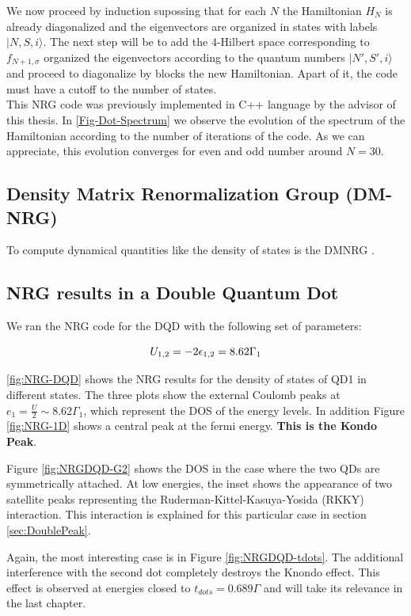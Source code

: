 We now proceed by induction supossing that for each $N$ the Hamiltonian $H_{N}$ is already diagonalized and the eigenvectors are organized in states with labels $\vert N,S,i\rangle.$ The next step will be to add the $4$-Hilbert space corresponding to $f_{N+1,\sigma}$ organized the eigenvectors according to the quantum numbers $\vert N',S',i\rangle$ and proceed to diagonalize by blocks the new Hamiltonian. Apart of it, the code must have a cutoff to the number of states. \\

This NRG code was previously implemented in C++ language by the advisor of this thesis. In \ref{Fig-Dot-Spectrum} we observe the evolution of the spectrum of the Hamiltonian according to the number of iterations of the code. As we can appreciate, this evolution converges for even and odd number around $N=30$.  \\



\subsection{Density Matrix Renormalization Group (DM-NRG)}
To compute  dynamical quantities \cite{costi_transport_1994} like the density of states  is the DMNRG \cite{hofstetter_generalized_2000}. 

\subsection{NRG results in a Double Quantum Dot}
We ran the NRG code for the DQD with the following set of parameters:


$$  U_{1,2} = -2\epsilon_{1,2} = 8.62\Gamma_1$$

\ref{fig:NRG-DQD} shows the NRG results for the density of states of QD1 in different states. The three plots show the external Coulomb peaks at $e_1 = \frac{U}{2} \sim 8.62\Gamma_1$, which represent the DOS of the energy levels. In addition  Figure \ref{fig:NRG-1D} shows a central peak at the fermi energy. \textbf{This is the Kondo Peak}. 

Figure \ref{fig:NRGDQD-G2} shows the DOS in the case where the two QDs are symmetrically attached.  At low energies, the inset shows the appearance of two satellite peaks representing the Ruderman-Kittel-Kasuya-Yosida (RKKY) interaction. This interaction is explained for this particular case in section \ref{sec:DoublePeak}.  

Again, the most interesting case is in Figure \ref{fig:NRGDQD-tdots}. The additional interference with the second dot completely destroys the Knondo effect. This effect is observed at energies closed to $t_{dots}=0.689\Gamma$ and  will take its relevance in the last chapter. 





